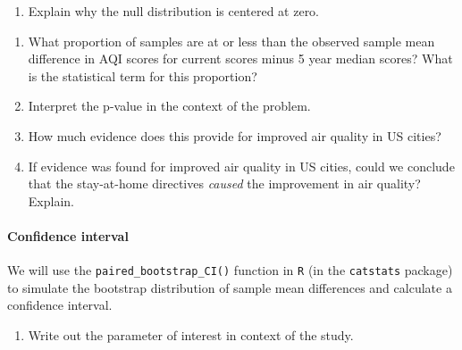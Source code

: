 \documentclass[
]{report}
\providecommand{\tightlist}{%
  \setlength{\itemsep}{0pt}\setlength{\parskip}{0pt}}
\begin{document}
\vspace{1.9in}

\begin{enumerate}
\def\labelenumi{\arabic{enumi}.}
\setcounter{enumi}{14}
\tightlist
\item
  Explain why the null distribution is centered at zero.
\end{enumerate}

\vspace{.5in}

\begin{enumerate}
\def\labelenumi{\arabic{enumi}.}
\setcounter{enumi}{15}
\item
  What proportion of samples are at or less than the observed sample mean difference in AQI scores for current scores minus 5 year median scores? What is the statistical term for this proportion?
  \vspace{.3in}
\item
  Interpret the p-value in the context of the problem.
  \vspace{.8in}
\item
  How much evidence does this provide for improved air quality in US cities?
  \vspace{.3in}
\item
  If evidence was found for improved air quality in US cities, could we conclude that the stay-at-home directives \emph{caused} the improvement in air quality? Explain.
  \vspace{.5in}
\end{enumerate}

\hypertarget{confidence-interval}{%
\paragraph*{Confidence interval}\label{confidence-interval}}

We will use the \texttt{paired\_bootstrap\_CI()} function in \texttt{R} (in the \texttt{catstats} package) to simulate the bootstrap distribution of sample mean differences and calculate a confidence interval.

\begin{enumerate}
\def\labelenumi{\arabic{enumi}.}
\setcounter{enumi}{19}
\tightlist
\item
  Write out the parameter of interest in context of the study.
\end{enumerate}

\vspace{.6in}
\newpage
\end{document}
